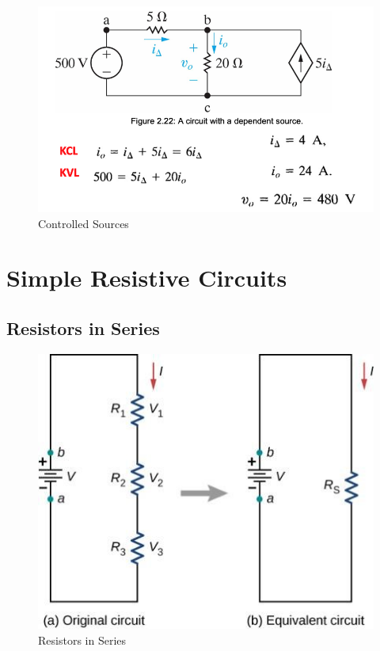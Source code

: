 \documentclass[14pt]{memoir}
\begin{document}
\begin{figure}[H]
\begin{center}
\includegraphics[scale=0.50]{fig/fig02_22.png}
\caption{Controlled Sources}
\label{fig:fig02_22}
\end{center}
\end{figure}


\chapter{Simple Resistive Circuits}

\section{Resistors in Series}

\begin{figure}[H]
\begin{center}
\includegraphics[scale=0.50]{fig/fig_10_12.jpg}
\caption{Resistors in Series}
\label{fig:10_12}
\end{center}
\end{figure}
\end{document}
